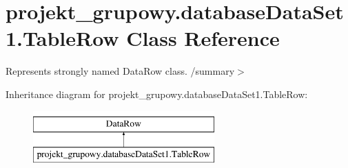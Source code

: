 \hypertarget{classprojekt__grupowy_1_1database_data_set1_1_1_table_row}{}\section{projekt\+\_\+grupowy.\+database\+Data\+Set1.\+Table\+Row Class Reference}
\label{classprojekt__grupowy_1_1database_data_set1_1_1_table_row}


Represents strongly named Data\+Row class. /summary$>$  


Inheritance diagram for projekt\+\_\+grupowy.\+database\+Data\+Set1.\+Table\+Row\+:\begin{figure}[H]
\begin{center}
\leavevmode
\includegraphics[height=2.000000cm]{classprojekt__grupowy_1_1database_data_set1_1_1_table_row}
\end{center}
\end{figure}
